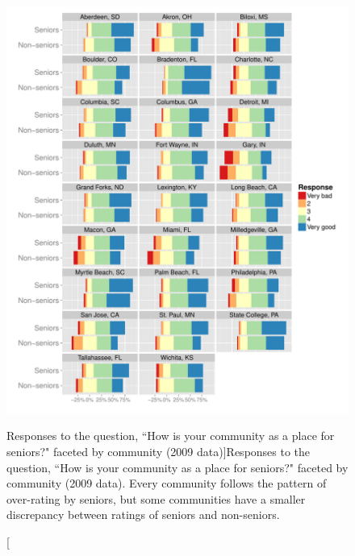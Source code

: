 \documentclass[smallextended]{svjour3}\usepackage[]{graphicx}\usepackage[]{color}
\newenvironment{knitrout}{}{} %
\begin{document}
\begin{knitrout}
\color{fgcolor}\begin{figure}

{\centering \includegraphics[width=0.99\linewidth]{figure/seniorPlot-1} 

}

\caption[Responses to the question, ``How is your community as a place for seniors?" faceted by community (2009 data)]{Responses to the question, ``How is your community as a place for seniors?" faceted by community (2009 data). Every community follows the pattern of over-rating by seniors, but some communities have a smaller discrepancy between ratings of seniors and non-seniors.}\label{fig:seniorPlot}
\end{figure}


\end{knitrout}
\end{document}
